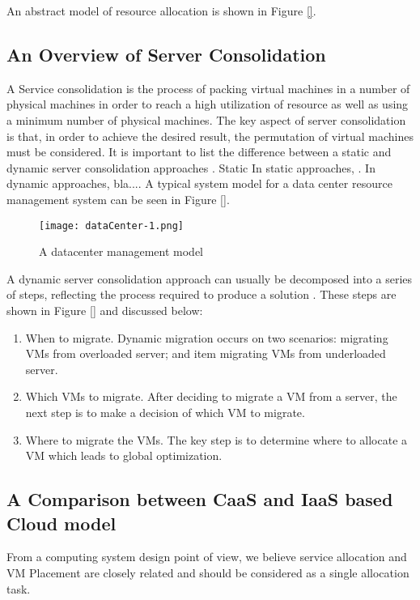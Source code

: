 An abstract model of resource allocation is shown in Figure \ref{}.





\subsection*{An Overview of Server Consolidation}

A Service consolidation is the process of packing virtual machines in a number of physical 
machines in order to reach a high utilization of resource as well as using a minimum number of 
physical machines. The key aspect of server consolidation is that, in order to achieve the 
desired result, the permutation of virtual machines must be considered. It is important to list the 
difference between a static and dynamic server consolidation approaches \cite{}. 
Static 
In static approaches, . In dynamic approaches, bla.... A typical system model for a data center
resource management system can be seen in Figure \ref{}. 
\begin{figure}
	\centering
	\texttt{[image: dataCenter-1.png]}
	\caption{A datacenter management model \cite{Varasteh:2015fu}}
	\label{fig:arch}
\end{figure}


A dynamic server consolidation approach
can usually be decomposed into a series of steps, 
reflecting the process required to produce a solution \cite{}. 
These steps are shown in Figure \ref{} and discussed below:
\begin{enumerate}
	\item When to migrate. Dynamic migration occurs on two scenarios: migrating VMs from overloaded server; and item migrating VMs from underloaded server.
	\item Which VMs to migrate.  After deciding to migrate a VM from a server, the next step is 
	to make a decision of which VM to migrate.
	\item Where to migrate the VMs. The key step is to determine where to allocate a VM which leads to global optimization.
\end{enumerate}


\subsection*{A Comparison between CaaS and IaaS based Cloud model}
From a computing system design point of view, we believe service allocation and VM Placement
are closely related and should be considered as a single allocation task.

